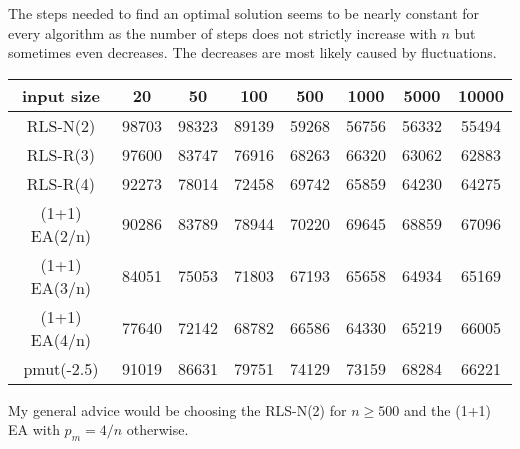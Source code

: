 The steps needed to find an optimal solution seems to be nearly constant for every algorithm as the number of steps does not strictly increase with $n$ but sometimes even decreases.
The decreases are most likely caused by fluctuations.

\begin{tabular}[h]{cccccccc}
      input size    & 20    & 50    & 100   & 500   & 1000  & 5000  & 10000 \\\hline
      RLS-N(2)      & 98703 & 98323 & 89139 & 59268 & 56756 & 56332 & 55494 \\
      RLS-R(3)      & 97600 & 83747 & 76916 & 68263 & 66320 & 63062 & 62883 \\
      RLS-R(4)      & 92273 & 78014 & 72458 & 69742 & 65859 & 64230 & 64275 \\
      (1+1) EA(2/n) & 90286 & 83789 & 78944 & 70220 & 69645 & 68859 & 67096 \\
      (1+1) EA(3/n) & 84051 & 75053 & 71803 & 67193 & 65658 & 64934 & 65169 \\
      (1+1) EA(4/n) & 77640 & 72142 & 68782 & 66586 & 64330 & 65219 & 66005 \\
      pmut(-2.5)    & 91019 & 86631 & 79751 & 74129 & 73159 & 68284 & 66221 \\
\end{tabular}

My general advice would be choosing the RLS-N(2) for $n\ge500$ and the (1+1) EA with $p_m=4/n$ otherwise.